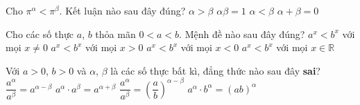 \begin{ex}%
	Cho $\pi^{\alpha}<\pi^{\beta}$. Kết luận nào sau đây đúng?
	\choice
	{$\alpha>\beta$}
	{$\alpha\beta=1$}
	{\True $\alpha<\beta$}
	{$\alpha+\beta=0$}
\end{ex}

\begin{ex}%
	Cho các số thực $a$, $b$ thỏa mãn $0<a<b$. Mệnh đề nào sau đây đúng?
	\choice
	{$a^x<b^x$ với mọi $x\neq 0$}
	{\True $a^x<b^x$ với mọi $x> 0$}
	{$a^x<b^x$ với mọi $x< 0$}
	{$a^x<b^x$ với mọi $x\in\mathbb{R}$}
\end{ex}
\begin{ex}%
	Với $a>0$, $b>0$ và $\alpha$, $\beta$ là các số thực bất kì, đẳng thức nào sau đây \textbf{sai}?
	\choice
	{$\dfrac{a^{\alpha}}{a^{\beta}}=a^{\alpha-\beta}$}
	{$a^{\alpha} \cdot a^{\beta}=a^{\alpha+\beta}$}
	{\True $\dfrac{a^{\alpha}}{a^{\beta}}=\left(\dfrac{a}{b}\right)^{\alpha-\beta}$}
	{$a^{\alpha} \cdot b^{\alpha}=\left(ab\right)^{\alpha}$}
\end{ex}

